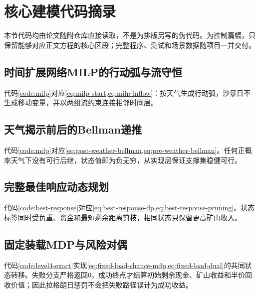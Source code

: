 \section{核心建模代码摘录}

本节代码均由论文随附仓库直接读取，不是为排版另写的伪代码。为控制篇幅，只保留能够对应正文方程的核心区段；完整程序、测试和场景数据随项目一并交付。

\subsection{时间扩展网络MILP的行动弧与流守恒}

代码\ref{code:milp}对应\cref{eq:milp-start,eq:milp-inflow}：按天气生成行动弧，沙暴日不生成移动变量，并以两组流约束连接相邻时间层。



\subsection{天气揭示前后的Bellman递推}

代码\ref{code:mdp}对应\cref{eq:post-weather-bellman,eq:pre-weather-bellman}。任何正概率天气下没有可行后继，状态值即为负无穷，从实现层保证支撑集稳健可行。



\subsection{完整最佳响应动态规划}

代码\ref{code:best-response}对应\cref{eq:best-response-dp,eq:best-response-pruning}。状态标签同时受负重、资金和最短剩余距离剪枝，相同状态只保留更高矿山收入。



\subsection{固定装载MDP与风险对偶}

代码\ref{code:level4-exact}实现\cref{eq:fixed-load-chance-mdp,eq:fixed-load-dual}的共同状态转移。失败分支严格返回0，成功终点才结算初始剩余现金、矿山收益和半价回收价值；因此拉格朗日惩罚不会把失败路径误计为成功收益。

